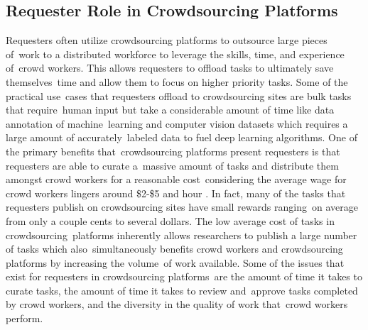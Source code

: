 \documentclass[letterpaper,12pt]{article}
\begin{document}
\subsection{Requester Role in Crowdsourcing Platforms}
Requesters often utilize crowdsourcing platforms to outsource large pieces of\ 
work to a distributed workforce to leverage the skills, time, and experience of\ 
crowd workers. \cite{kuek2015global} This allows requesters to offload tasks to ultimately save themselves\ 
time and allow them to focus on higher priority tasks. Some of the practical use\ 
cases that requesters offload to crowdsourcing sites are bulk tasks that require\ 
human input but take a considerable amount of time like data annotation of machine\ 
learning and computer vision datasets which requires a large amount of accurately\ 
labeled data to fuel deep learning algorithms. \cite{hitlin2016research} One of the primary benefits that\
crowdsourcing platforms present requesters is that requesters are able to curate a\ 
massive amount of tasks and distribute them amongst crowd workers for a reasonable cost\ 
considering the average wage for crowd workers lingers around \$2-\$5 and hour \cite{Kaplan2018,hara2018data}.
In fact, many of the tasks that requesters publish on crowdsourcing sites have small rewards ranging\
on average from only a couple cents to several dollars. The low average cost of tasks in crowdsourcing\
platforms inherently allows researchers to publish a large number of tasks which also\
simultaneously benefits crowd workers and crowdsourcing platforms by increasing the volume\
of work available. Some of the issues that exist for requesters in crowdsourcing platforms\
are the amount of time it takes to curate tasks, the amount of time it takes to review and\
approve tasks completed by crowd workers, and the diversity in the quality of work that\
crowd workers perform.
\end{document}
